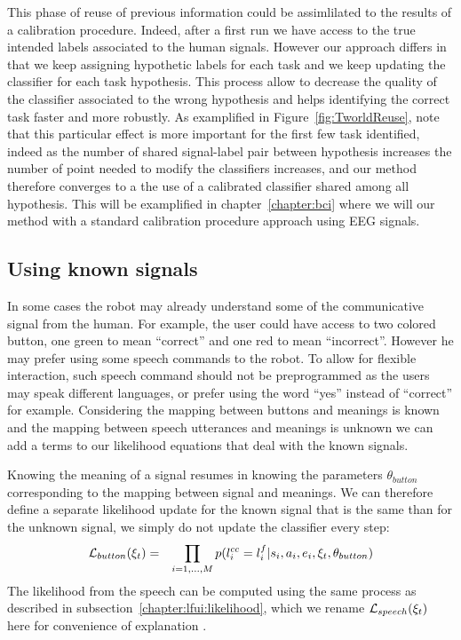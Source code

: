 This phase of reuse of previous information could be assimlilated to the results of a calibration procedure. Indeed, after a first run we have access to the true intended labels associated to the human signals. However our approach differs in that we keep assigning hypothetic labels for each task and we keep updating the classifier for each task hypothesis. This process allow to decrease the quality of the classifier associated to the wrong hypothesis and helps identifying the correct task faster and more robustly. As examplified in Figure~\ref{fig:TworldReuse}, note that this particular effect is more important for the first few task identified, indeed as the number of shared signal-label pair between hypothesis increases the number of point needed to modify the classifiers increases, and our method therefore converges to a the use of a calibrated classifier shared among all hypothesis. This will be examplified in chapter~\ref{chapter:bci} where we will our method with a standard calibration procedure approach using EEG signals.

\subsection{Using known signals}

In some cases the robot may already understand some of the communicative signal from the human. For example, the user could have access to two colored button, one green to mean ``correct'' and one red to mean ``incorrect''. However he may prefer using some speech commands to the robot. To allow for flexible interaction, such speech command should not be preprogrammed as the users may speak different languages, or prefer using the word ``yes'' instead of ``correct'' for example. Considering the mapping between buttons and meanings is known and the mapping between speech utterances and meanings is unknown we can add a terms to our likelihood equations that deal with the known signals. 

Knowing the meaning of a signal resumes in knowing the parameters $\theta_{button}$ corresponding to the mapping between signal and meanings. We can therefore define a separate likelihood update for the known signal that is the same than for the unknown signal, we simply do not update the classifier every step:
%
\begin{eqnarray}
\mathcal{L}_{button}(\xi_t) &=& \prod_{i = 1,\ldots, M} p(l^{cc}_i = l^f_i | s_i, a_i, e_i, \xi_t, \theta_{button})
\end{eqnarray}
%
The likelihood from the speech can be computed using the same process as described in subsection~\ref{chapter:lfui:likelihood}, which we rename $\mathcal{L}_{speech}(\xi_t)$ here for convenience of explanation .

